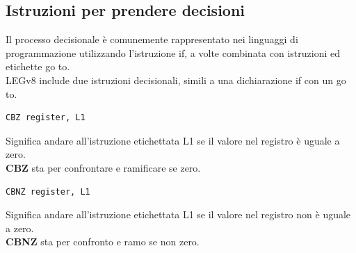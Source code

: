 \documentclass[12pt,a4paper]{article}
\begin{document}
\subsection{Istruzioni per prendere decisioni}
Il processo decisionale è comunemente rappresentato nei linguaggi di programmazione utilizzando l'istruzione if, a volte combinata con istruzioni ed etichette go to.\\
LEGv8 include due istruzioni decisionali, simili a una dichiarazione if con un go to.
\begin{center}
\begin{minipage}{.2\linewidth}
\begin{verbatim}
CBZ register, L1
\end{verbatim}
\end{minipage}
\end{center}
Significa andare all'istruzione etichettata L1 se il valore nel registro è uguale a zero.\\
\textbf{CBZ} sta per confrontare e ramificare se zero.
\begin{center}
\begin{minipage}{.2\linewidth}
\begin{verbatim}
CBNZ register, L1
\end{verbatim}
\end{minipage}
\end{center}
Significa andare all'istruzione etichettata L1 se il valore nel registro non è uguale a zero.\\
\textbf{CBNZ} sta per confronto e ramo se non zero.
\end{document}
